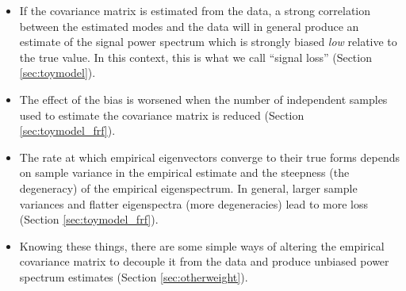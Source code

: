 \documentclass[preprint2,numberedappendix,tighten]{aastex6}  %
\begin{document}
\begin{itemize}

\item If the covariance matrix is estimated from the data, a strong correlation between the estimated modes and the data will in general produce an estimate of the signal power spectrum which is strongly biased {\it low} relative to the true value.  In this context, this is what we call ``signal loss''  (Section \ref{sec:toymodel}).

\item The effect of the bias is worsened when the number of independent samples used to estimate the covariance matrix is reduced (Section \ref{sec:toymodel_frf}).

\item The rate at which empirical eigenvectors converge to their true forms depends on sample variance in the empirical estimate and the steepness (the degeneracy) of the empirical eigenspectrum. In general, larger sample variances and flatter eigenspectra (more degeneracies) lead to more loss (Section \ref{sec:toymodel_frf}).


\item Knowing these things, there are some simple ways of altering the empirical covariance matrix to decouple it from the data and produce unbiased power spectrum estimates (Section \ref{sec:otherweight}).


\end{itemize}
\end{document}
